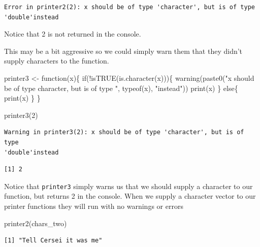 \documentclass[
  letterpaper,
  DIV=11,
  numbers=noendperiod,
  oneside]{scrreprt}
\newenvironment{Shaded}{\begin{snugshade}}{\end{snugshade}}
\newcommand{\ControlFlowTok}[1]{\textcolor[rgb]{0.00,0.23,0.31}{#1}}
\newcommand{\DecValTok}[1]{\textcolor[rgb]{0.68,0.00,0.00}{#1}}
\newcommand{\FunctionTok}[1]{\textcolor[rgb]{0.28,0.35,0.67}{#1}}
\newcommand{\NormalTok}[1]{\textcolor[rgb]{0.00,0.23,0.31}{#1}}
\newcommand{\OtherTok}[1]{\textcolor[rgb]{0.00,0.23,0.31}{#1}}
\newcommand{\SpecialCharTok}[1]{\textcolor[rgb]{0.37,0.37,0.37}{#1}}
\newcommand{\StringTok}[1]{\textcolor[rgb]{0.13,0.47,0.30}{#1}}
\begin{document}
\begin{verbatim}
Error in printer2(2): x should be of type 'character', but is of type 'double'instead
\end{verbatim}

Notice that 2 is not returned in the console.

This may be a bit aggressive so we could simply warn them that they
didn't supply characters to the function.

\begin{Shaded}
\begin{Highlighting}[]
\NormalTok{printer3 }\OtherTok{\textless{}{-}} \ControlFlowTok{function}\NormalTok{(x)\{}
  \ControlFlowTok{if}\NormalTok{(}\SpecialCharTok{!}\FunctionTok{isTRUE}\NormalTok{(}\FunctionTok{is.character}\NormalTok{(x)))\{}
    \FunctionTok{warning}\NormalTok{(}\FunctionTok{paste0}\NormalTok{(}\StringTok{"x should be of type \textquotesingle{}character\textquotesingle{}, but is of type \textquotesingle{}"}\NormalTok{, }\FunctionTok{typeof}\NormalTok{(x), }\StringTok{"\textquotesingle{}instead"}\NormalTok{))}
    \FunctionTok{print}\NormalTok{(x)}
\NormalTok{  \}}
  \ControlFlowTok{else}\NormalTok{\{}
    \FunctionTok{print}\NormalTok{(x)}
\NormalTok{  \}}
\NormalTok{\}}

\FunctionTok{printer3}\NormalTok{(}\DecValTok{2}\NormalTok{)}
\end{Highlighting}
\end{Shaded}

\begin{verbatim}
Warning in printer3(2): x should be of type 'character', but is of type
'double'instead
\end{verbatim}

\begin{verbatim}
[1] 2
\end{verbatim}

Notice that \texttt{printer3} simply warns us that we should supply a
character to our function, but returns 2 in the console. When we supply
a character vector to our printer functions they will run with no
warnings or errors

\begin{Shaded}
\begin{Highlighting}[]
\FunctionTok{printer2}\NormalTok{(chars\_two)}
\end{Highlighting}
\end{Shaded}

\begin{verbatim}
[1] "Tell Cersei it was me"
\end{verbatim}
\end{document}
